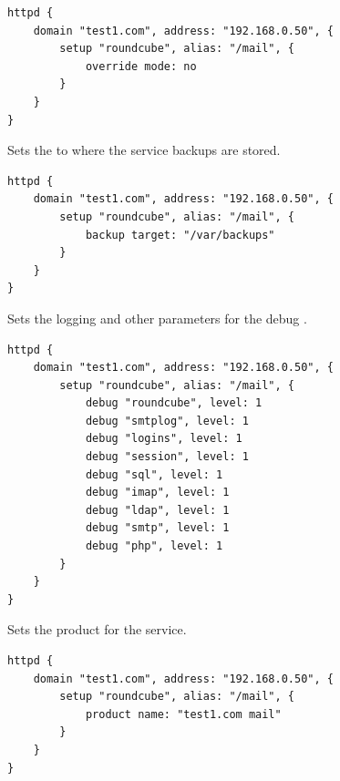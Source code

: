 \begin{lstlisting}[style=Java]
httpd {
    domain "test1.com", address: "192.168.0.50", {
        setup "roundcube", alias: "/mail", {
            override mode: no
        }
    }
}
\end{lstlisting}


Sets the  to where the service backups are stored.

\begin{lstlisting}[style=Java]
httpd {
    domain "test1.com", address: "192.168.0.50", {
        setup "roundcube", alias: "/mail", {
            backup target: "/var/backups"
        }
    }
}
\end{lstlisting}


Sets the logging  and other parameters for the debug .

\begin{lstlisting}[style=Java]
httpd {
    domain "test1.com", address: "192.168.0.50", {
        setup "roundcube", alias: "/mail", {
            debug "roundcube", level: 1
            debug "smtplog", level: 1
            debug "logins", level: 1
            debug "session", level: 1
            debug "sql", level: 1
            debug "imap", level: 1
            debug "ldap", level: 1
            debug "smtp", level: 1
            debug "php", level: 1
        }
    }
}
\end{lstlisting}


Sets the product  for the service.

\begin{lstlisting}[style=Java]
httpd {
    domain "test1.com", address: "192.168.0.50", {
        setup "roundcube", alias: "/mail", {
            product name: "test1.com mail"
        }
    }
}
\end{lstlisting}


